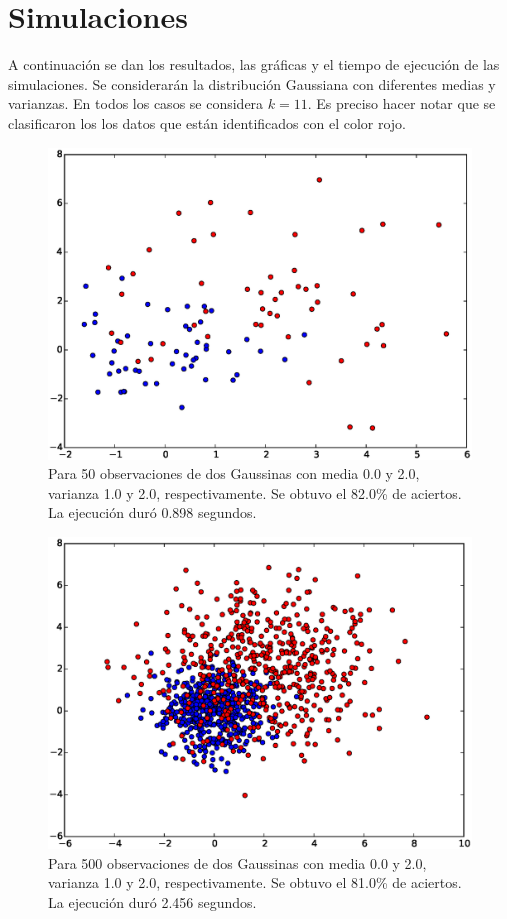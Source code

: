 \documentclass[11pt,letterpaper,reqno]{article}
\begin{document}
\section{Simulaciones}

A continuación se dan los resultados, las gráficas y el tiempo de ejecución de las simulaciones. Se considerarán la distribución Gaussiana con diferentes medias y varianzas. En todos los casos se considera $k=11$. Es preciso hacer notar que se clasificaron los los datos que están identificados con el color rojo.

\begin{figure}[h]
	\centering
	\includegraphics[scale=.5]{img1}
	\caption{Para 50 observaciones de dos Gaussinas con media 0.0 y 2.0, varianza 1.0 y 2.0, respectivamente. Se obtuvo el 82.0\% de aciertos. La ejecución duró 0.898 segundos.}
\end{figure}

\begin{figure}[h]
	\centering
	\includegraphics[scale=.5]{img2}
	\caption{Para 500 observaciones de dos Gaussinas con media 0.0 y 2.0, varianza 1.0 y 2.0, respectivamente. Se obtuvo el 81.0\% de aciertos. La ejecución duró 2.456 segundos.}
\end{figure}
\end{document}
